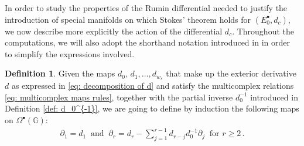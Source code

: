 \documentclass[dvipsnames]{amsart}
\theoremstyle{definition}
\newtheorem{definition}[theorem]{Definition}
\theoremstyle{definition}
\numberwithin{equation}{section}
\newcommand{\G}{\mathbb{G}}
\begin{document}
\begin{center}

\end{center}
In order to study the properties of the Rumin differential needed to justify the introduction of special manifolds on which Stokes' theorem holds for $(E_0^\bullet,d_c)$, we now describe more explicitly the action of the differential $d_c$. Throughout the computations, we will also adopt the shorthand notation introduced in \cite{tripaldi2026spectralcomplexestruncatedmulticomplexes} in order to simplify the expressions involved.
\begin{definition}\label{def: partial operators}
    Given the maps $d_0,\,d_{1},\ldots,d_{w_s}$ that make up the exterior derivative $d$ as expressed in \eqref{eq: decomposition of d} and satisfy the multicomplex relations \eqref{eq: multicomplex maps rules}, together with the partial inverse $d_0^{-1}$ introduced in Definition \ref{def: d_0^{-1}}, we are going to define by induction the following maps on $\Omega^\bullet(\G)$:
    \begin{align}\label{eq: partial maps}
        \partial_1=d_1\ \text{ and }\ \partial_r=d_r-\sum_{j=1}^{r-1}d_{r-j}d_0^{-1}\partial_j\ \text{ for }r\ge 2\,.
    \end{align}
\end{definition}
\end{document}
